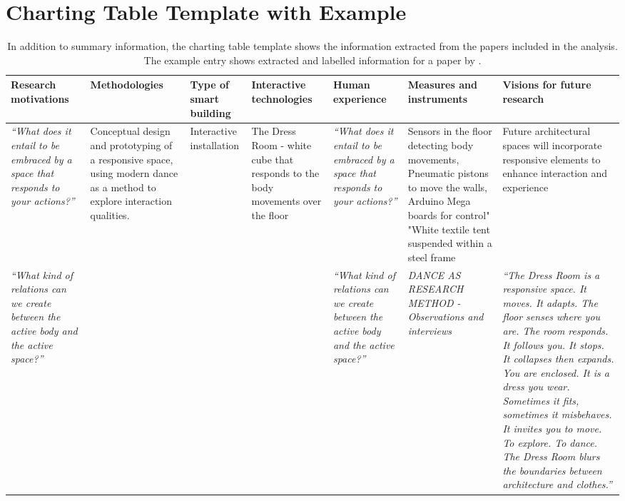 \section{Charting Table Template with Example}
\label{sec:appendix-scr-template}

\begin{landscape}
\begin{table}[p]
  \centering
  \caption{In addition to summary information, the charting table template shows the information extracted from the papers included in the analysis. The example entry shows extracted and labelled information for a paper by \citet{vallgaarda2014dress}.}
  \label{tab:chartingtable}

  \appendixtablefont
  \verytighttable

  \begin{tabularx}{\linewidth}{@{}
    p{.16\linewidth}
    p{.12\linewidth}
    p{.10\linewidth}
    p{.13\linewidth}
    p{.20\linewidth}
    p{.12\linewidth}
    X
  @{}}
    \toprule
    Research motivations &
    Methodologies &
    Type of smart building &
    Interactive technologies &
    Human experience &
    Measures and instruments &
    Visions for future research \\
    \midrule
        \emph{``What does it entail to be embraced by a space that responds to your actions?''} & Conceptual design and prototyping of a responsive space, using modern dance as a method to explore interaction qualities. &  Interactive installation & The Dress Room - white cube that responds to the body movements over the floor & \emph{``What does it entail to be embraced by a space that responds to your actions?''} & Sensors in the floor detecting body movements, Pneumatic pistons to move the walls, Arduino Mega boards for control" "White textile tent suspended within a steel frame & Future architectural spaces will incorporate responsive elements to enhance interaction and experience \\
        \emph{``What kind of relations can we create between the active body and the active space?''} & & & &\emph{``What kind of relations can we create between the active body and the active space?''} & \emph{DANCE AS RESEARCH METHOD - Observations and interviews} & \emph{``The Dress Room is a responsive space. It moves. It adapts. The floor senses where you are. The room responds. It follows you. It stops. It collapses then expands. You are enclosed. It is a dress you wear. Sometimes it fits, sometimes it misbehaves. It invites you to move. To explore. To dance. The Dress Room blurs the boundaries between architecture and clothes.''} \\

\end{tabularx}
\end{table}
\end{landscape}
